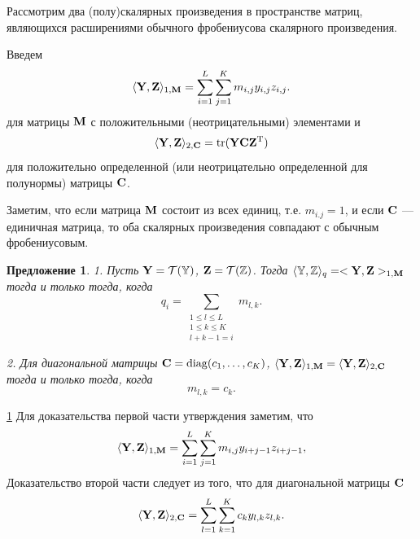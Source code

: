 \documentclass[12pt,a4paper,fleqn,leqno]{article}
\DeclareMathOperator{\tr}{tr}
\newtheorem{proposition}{Предложение}
\begin{document}
Рассмотрим два (полу)скалярных произведения в пространстве матриц, являющихся расширениями
обычного фробениусова скалярного произведения.

Введем
\begin{equation}
\label{eq:norm1M}
    \langle\mathbf{Y},\mathbf{Z}\rangle_{1,\mathbf{M}} = \sum_{i = 1}^L \sum_{j=1}^K m_{i,j} y_{i,j} z_{i,j}.
\end{equation}
для матрицы $\mathbf{M}$ с положительными (неотрицательными) элементами и
\begin{equation}
\label{eq:norm2S}
    \langle\bfY,\bfZ\rangle_{2,\bfC} = \tr(\bfY \bfC \bfZ^\rmT)
\end{equation}
для положительно определенной (или неотрицательно определенной для полунормы) матрицы $\mathbf{C}$.

Заметим, что если матрица $\mathbf{M}$ состоит из всех единиц, т.е. $m_{i.j}=1$,
и если $\mathbf{C}$ --- единичная матрица, то оба скалярных произведения совпадают
с обычным фробениусовым.

\begin{proposition}
\label{prop:equiv_tasks}
1. Пусть $\mathbf{Y} = \mathcal{T}(\mathbb{Y})$,  $\mathbf{Z} = \mathcal{T}(\mathbb{Z})$. Тогда $\langle\mathbb{Y},\mathbb{Z}\rangle_q= <\mathbf{Y},\mathbf{Z}>_{1,\mathbf{M}}$ тогда и только тогда, когда
\begin{equation}\label{qi_mi}
q_i = \sum_{\substack{1 \le l \le L \\ 1 \le k \le K \\ l+k-1=i}} m_{l,k}.
\end{equation}

2. Для диагональной матрицы $\mathbf{C}=\mathop{\mathrm{diag}}(c_1,\ldots,c_K)$, $\langle\mathbf{Y},\mathbf{Z}\rangle_{1,\mathbf{M}}= \langle\mathbf{Y},\mathbf{Z}\rangle_{2,\mathbf{C}}$ тогда и только тогда, когда
\begin{equation}\label{sk_mlk}
m_{l,k}=c_k.
\end{equation}
\end{proposition}
\begin{proof5}{\ref{prop:equiv_tasks}}
Для доказательства первой части утверждения заметим, что
\begin{equation*}
\langle \mathbf{Y}, \mathbf{Z} \rangle_{1,\mathbf{M}} = \sum_{i = 1}^L \sum_{j = 1}^K m_{i,j} y_{i + j - 1} z_{i + j - 1},
\end{equation*}
Доказательство второй части следует из того, что для диагональной матрицы $\mathbf{C}$
\begin{equation*}
\langle \mathbf{Y}, \mathbf{Z} \rangle_{2,\mathbf{C}} = \sum_{l=1}^L \sum_{k=1}^K c_k y_{l,k} z_{l, k}.
\end{equation*}
\end{proof5}
\end{document}
